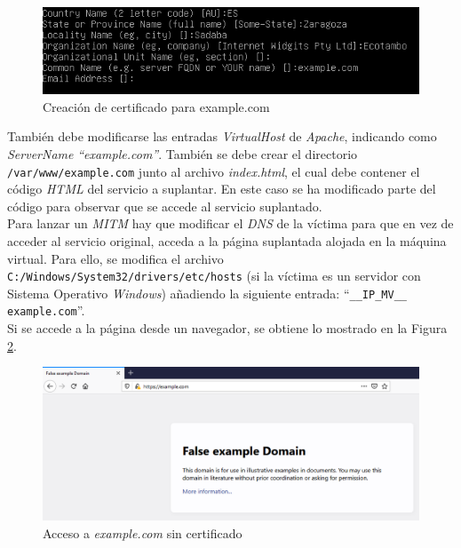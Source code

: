 \documentclass[10pt,a4paper]{article}
\begin{document}
\begin{figure}[h!]
	\centering
	\includegraphics[scale=0.6]{images/Tarea5_paso1.png}
	\caption{Creación de certificado para example.com}
	\label{fig:tarea5_paso1}
\end{figure}

También debe modificarse las entradas \textit{VirtualHost} de \textit{Apache}, indicando como \textit{ServerName} \emph{``example.com''}. 
También se debe crear el directorio \texttt{/var/www/example.com} junto al archivo \textit{index.html}, el cual debe contener el código \textit{HTML} del servicio a suplantar. En este caso se ha modificado parte del código para observar que se accede al servicio suplantado.\\
Para lanzar un \emph{MITM} hay que modificar el \emph{DNS} de la víctima para que en vez de acceder al servicio original, acceda a la página suplantada alojada en la máquina virtual. Para ello, se modifica el archivo \texttt{C:/Windows/System32/drivers/etc/hosts} (si la víctima es un servidor con Sistema Operativo \emph{Windows}) añadiendo la siguiente entrada: ``\texttt{\_\_IP\_MV\_\_ example.com}''.\\

Si se accede a la página desde un navegador, se obtiene lo mostrado en la Figura \ref{fig:Tarea5_paso3}.\\

\begin{figure}[h!]
	\centering
	\includegraphics[scale=0.5]{images/Tarea5_paso3.png}
	\caption{Acceso a \textit{example.com} sin certificado}
	\label{fig:Tarea5_paso3}
\end{figure}
\end{document}
